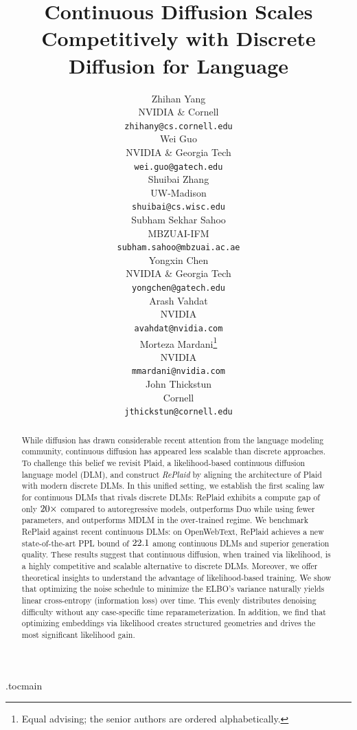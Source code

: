 \documentclass{article}
\title{Continuous Diffusion Scales Competitively with Discrete Diffusion for Language}
\author{%
  Zhihan Yang \\
   NVIDIA \& Cornell \\
  \texttt{zhihany@cs.cornell.edu} \\
  \And
  Wei Guo \\
  NVIDIA \& Georgia Tech \\
  \texttt{wei.guo@gatech.edu} \\
  \And
  Shuibai Zhang \\
  UW-Madison\\
  \texttt{shuibai@cs.wisc.edu} \\
  \And
  Subham Sekhar Sahoo \\
  MBZUAI-IFM\\
  \texttt{subham.sahoo@mbzuai.ac.ae} \\
  \And
  Yongxin Chen \\
  NVIDIA \& Georgia Tech \\
  \texttt{yongchen@gatech.edu} \\
  \And
  Arash Vahdat \\
  NVIDIA \\
  \texttt{avahdat@nvidia.com} \\
  \And
  Morteza Mardani\thanks{Equal advising; the senior authors are ordered alphabetically.} \\
  NVIDIA \\
  \texttt{mmardani@nvidia.com} \\
  \And
  John Thickstun\samethanks \\
  Cornell \\
  \texttt{jthickstun@cornell.edu} \\
}
\begin{document}
\maketitle

%

\etocdepthtag.toc{main}  %

%

%
%




%

\begin{abstract}
%
%

%



%
While diffusion has drawn considerable recent attention from the language modeling community, continuous diffusion has appeared less scalable than discrete approaches. To challenge this belief we revisit Plaid, a likelihood-based continuous diffusion language model (DLM), and construct \textit{RePlaid} by aligning the architecture of Plaid with modern discrete DLMs. In this unified setting, we establish the first scaling law for continuous DLMs that rivals discrete DLMs: RePlaid exhibits a compute gap of only $20\times$ compared to autoregressive models, outperforms Duo while using fewer parameters, and outperforms MDLM in the over-trained regime. We benchmark RePlaid against recent continuous DLMs: on OpenWebText, RePlaid achieves a new state-of-the-art PPL bound of $22.1$ among continuous DLMs and superior generation quality. These results suggest that continuous diffusion, when trained via likelihood, is a highly competitive and scalable alternative to discrete DLMs. Moreover, we offer theoretical insights to understand the advantage of likelihood-based training. We show that optimizing the noise schedule to minimize the ELBO's variance naturally yields linear cross-entropy (information loss) over time. This evenly distributes denoising difficulty without any case-specific time reparameterization. In addition, we find that optimizing embeddings via likelihood creates structured geometries and drives the most significant likelihood gain.



%


%

%

\end{abstract}

%

%

%
\end{document}
